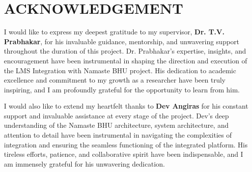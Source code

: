 
\newpage
\chapter*{ACKNOWLEDGEMENT}

\normalsize
I would like to express my deepest gratitude to my supervisor,\textbf{ Dr. T.V. Prabhakar}, for his invaluable guidance, mentorship, and unwavering support throughout the duration of this project. Dr. Prabhakar's expertise, insights, and encouragement have been instrumental in shaping the direction and execution of the LMS Integration with Namaste BHU project. His dedication to academic excellence and commitment to my growth as a researcher have been truly inspiring, and I am profoundly grateful for the opportunity to learn from him.

I would also like to extend my heartfelt thanks to \textbf{Dev Angiras} for his constant support and invaluable assistance at every stage of the project. Dev's deep understanding of the Namaste BHU architecture, system architecture, and attention to detail have been instrumental in navigating the complexities of integration and ensuring the seamless functioning of the integrated platform. His tireless efforts, patience, and collaborative spirit have been indispensable, and I am immensely grateful for his unwavering dedication.



